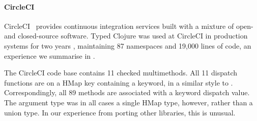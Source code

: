 \paragraph{CircleCI}
CircleCI~\cite{CircleCI}
provides continuous integration services built with a mixture of open-
and closed-source software.
Typed Clojure was used at CircleCI in production systems for two years \cite{CircleCIUsesTC},
maintaining
87 namespaces and 19,000 lines of code,
an experience we summarise in .
%
%

%
%
%

The CircleCI code base contains 11 checked multimethods.
 All 11 dispatch functions
are on a HMap key containing a keyword, in a similar style to
.
Correspondingly, all 89 methods are associated with a keyword dispatch value.
The argument type was in all cases a single HMap type, however,
rather than a union type.
In our experience from porting other libraries, this is unusual.

